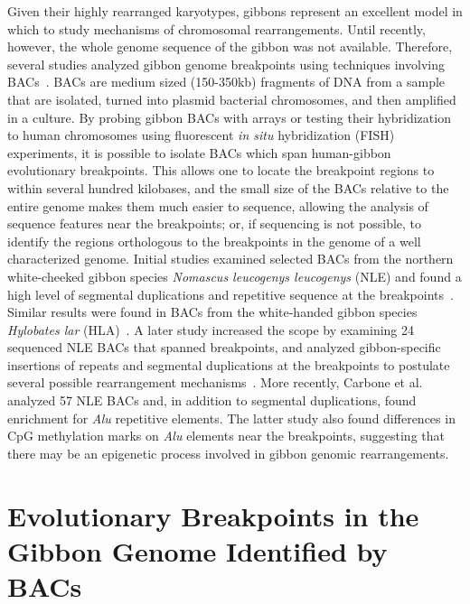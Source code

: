 Given their highly rearranged karyotypes, gibbons represent an excellent model in which to study mechanisms of chromosomal rearrangements. Until recently, however, the whole genome sequence of the gibbon was not available. Therefore, several studies analyzed gibbon genome breakpoints using techniques involving BACs~\cite{Girirajan:2009kw,Carbone:2006jk,Carbone:2009p1012}. BACs are medium sized (150-350kb) fragments of DNA from a sample that are isolated, turned into plasmid bacterial chromosomes, and then amplified in a culture. By probing gibbon BACs with arrays or testing their hybridization to human chromosomes using fluorescent \emph{in situ} hybridization (FISH) experiments, it is possible to isolate BACs which span human-gibbon evolutionary breakpoints. This allows one to locate the breakpoint regions to within several hundred kilobases, and the small size of the BACs relative to the entire genome makes them much easier to sequence, allowing the analysis of sequence features near the breakpoints; or, if sequencing is not possible, to identify the regions orthologous to the breakpoints in the genome of a well characterized genome. Initial studies examined selected BACs from the northern white-cheeked gibbon species \emph{Nomascus leucogenys leucogenys} (NLE) and found a high level of segmental duplications and repetitive sequence at the breakpoints~\cite{Carbone:2006jk,Roberto:2007dt}. Similar results were found in BACs from the white-handed gibbon species \emph{Hylobates lar} (HLA)~\cite{Misceo:2008kg}. A later study increased the scope by examining 24 sequenced NLE BACs that spanned breakpoints, and analyzed gibbon-specific insertions of repeats and segmental duplications at the breakpoints to postulate several possible rearrangement mechanisms~\cite{Girirajan:2009kw}. More recently, Carbone et al.~\cite{Carbone:2009p1012} analyzed 57 NLE BACs and, in addition to segmental duplications, found enrichment for \emph{Alu} repetitive elements. The latter study also found differences in CpG methylation marks on \emph{Alu} elements near the breakpoints, suggesting that there may be an epigenetic process involved in gibbon genomic rearrangements.

\section{Evolutionary Breakpoints in the Gibbon Genome  Identified by BACs}\label{gibbon_breakpoint_bac_analysis}

